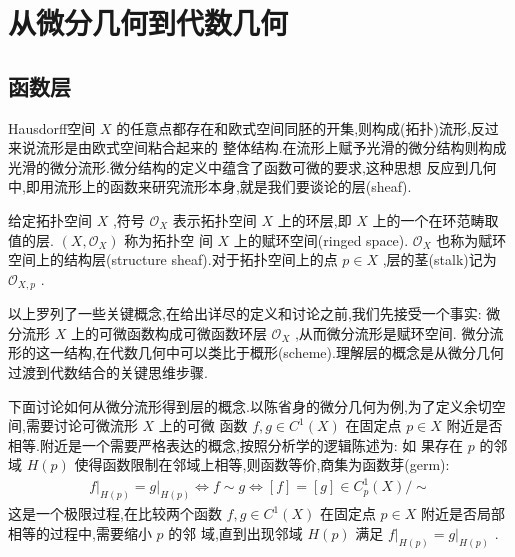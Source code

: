 \chapter{从微分几何到代数几何}
\section{函数层}
Hausdorff空间 $X$ 的任意点都存在和欧式空间同胚的开集,则构成(拓扑)流形,反过来说流形是由欧式空间粘合起来的 整体结构.在流形上赋予光滑的微分结构则构成光滑的微分流形.微分结构的定义中蕴含了函数可微的要求,这种思想 反应到几何中,即用流形上的函数来研究流形本身,就是我们要谈论的层(sheaf).
\begin{note}[]
给定拓扑空间 $X$ ,符号 $\mathcal{O}_X$ 表示拓扑空间 $X$ 上的环层,即 $X$ 上的一个在环范畴取值的层. $\left(X, \mathcal{O}_X\right)$ 称为拓扑空 间 $X$ 上的赋环空间(ringed space). $\mathcal{O}_X$ 也称为赋环空间上的结构层(structure sheaf).对于拓扑空间上的点 $p \in X$ ,层的茎(stalk)记为 $\mathcal{O}_{X, p}$ .
\end{note}
以上罗列了一些关键概念,在给出详尽的定义和讨论之前,我们先接受一个事实:
微分流形 $X$ 上的可微函数构成可微函数环层 $\mathcal{O}_X$ ,从而微分流形是赋环空间.
微分流形的这一结构,在代数几何中可以类比于概形(scheme).理解层的概念是从微分几何过渡到代数结合的关键思维步骤.

下面讨论如何从微分流形得到层的概念.以陈省身的微分几何为例,为了定义余切空间,需要讨论可微流形 $X$ 上的可微 函数 $f, g \in C^1(X)$ 在固定点 $p \in X$ 附近是否相等.附近是一个需要严格表达的概念,按照分析学的逻辑陈述为: 如 果存在 $p$ 的邻域 $H(p)$ 使得函数限制在邻域上相等,则函数等价,商集为函数芽(germ):
\begin{align*}
\left.f\right|_{H(p)}=\left.g\right|_{H(p)} \Leftrightarrow f \sim g \Leftrightarrow[f]=[g] \in C_p^1(X) / \sim
\end{align*}
这是一个极限过程,在比较两个函数 $f, g \in C^1(X)$ 在固定点 $p \in X$ 附近是否局部相等的过程中,需要缩小 $p$ 的邻 域,直到出现邻域 $H(p)$ 满足 $\left.f\right|_{H(p)}=\left.g\right|_{H(p)}$ .
